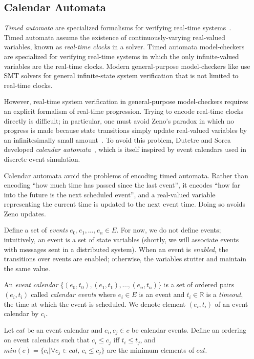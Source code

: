 \documentclass{IEEEtran/IEEEtran}
\newcommand{\lee}[1]{ } %
\newcommand{\lee}[1]{ {\color{blue}$<$lee: #1$>$} } %
\begin{document}
\subsection{Calendar Automata}\label{sec:calendar}\label{sec:calendar}
\emph{Timed automata} are specialized formalisms for verifying real-time systems~\cite{}. Timed automata assume the existence of continuously-varying real-valued variables, known as \emph{real-time clocks} in a solver. Timed automata model-checkers are specialized for verifying real-time systems in which the only infinite-valued variables are the real-time clocks. Modern general-purpose model-checkers like \lee{name some} use SMT solvers for general infinite-state system verification that is not limited to real-time clocks.

However, real-time system verification in general-purpose model-checkers requires an explicit formalism of real-time progression. Trying to encode real-time clocks directly is difficult; in particular, one must avoid Zeno's paradox in which no progress is made because state transitions simply update real-valued variables by an infinitesimally small amount~\cite{bruno,lamport}. To avoid this problem, Dutetre and Sorea developed \emph{calendar automata}~\cite{bruno}, which is itself inspired by event calendars used in discrete-event simulation.

Calendar automata avoid the problems of encoding timed automata. Rather than encoding ``how much time has passed since the last event'', it encodes ``how far into the future is the next scheduled event'', and a real-valued variable representing the current time is updated to the next event time. Doing so avoids Zeno updates.

Define a set of \emph{events} $e_0, e_1, \ldots, e_n \in E$. For now, we do not define events; intuitively, an event is a set of state variables (shortly, we will associate events with messages sent in a distributed system). When an event is \emph{enabled}, the transitions over events are enabled; otherwise, the variables stutter and maintain the same value.

An \emph{event calendar} $\{ (e_0, t_0), (e_1, t_1), \ldots, (e_n, t_n) \}$ is a set of ordered pairs $(e_i, t_i)$ called \emph{calendar events} where $e_i \in E$ is an event and $t_i \in \mathbb{R}$ is a \emph{timeout}, the time at which the event is scheduled. We denote element $(e_i, t_i)$ of an event calendar by $c_i$.

Let $cal$ be an event calendar and $c_i, c_j \in c$ be calendar events. Define an ordering on event calendars such that $c_i \leq c_j$ iff $t_i \leq t_j$, and $min(c) = \{ c_i | \forall c_j \in cal, \, c_i \leq c_j  \}$ are the minimum elements of $cal$.
\end{document}
